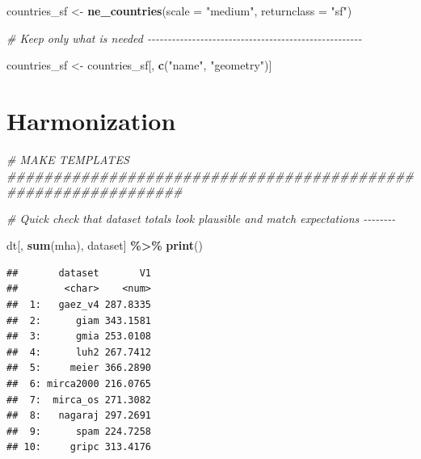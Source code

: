 \documentclass[
  11pt,
]{article}
\newenvironment{Shaded}{\begin{snugshade}}{\end{snugshade}}
\newcommand{\AttributeTok}[1]{\textcolor[rgb]{0.13,0.29,0.53}{#1}}
\newcommand{\CommentTok}[1]{\textcolor[rgb]{0.56,0.35,0.01}{\textit{#1}}}
\newcommand{\FunctionTok}[1]{\textcolor[rgb]{0.13,0.29,0.53}{\textbf{#1}}}
\newcommand{\NormalTok}[1]{#1}
\newcommand{\OtherTok}[1]{\textcolor[rgb]{0.56,0.35,0.01}{#1}}
\newcommand{\SpecialCharTok}[1]{\textcolor[rgb]{0.81,0.36,0.00}{\textbf{#1}}}
\newcommand{\StringTok}[1]{\textcolor[rgb]{0.31,0.60,0.02}{#1}}
\begin{document}
\begin{Shaded}
\begin{Highlighting}[]
\NormalTok{countries\_sf }\OtherTok{\textless{}{-}} \FunctionTok{ne\_countries}\NormalTok{(}\AttributeTok{scale =} \StringTok{"medium"}\NormalTok{, }\AttributeTok{returnclass =} \StringTok{"sf"}\NormalTok{)}

\CommentTok{\# Keep only what is needed {-}{-}{-}{-}{-}{-}{-}{-}{-}{-}{-}{-}{-}{-}{-}{-}{-}{-}{-}{-}{-}{-}{-}{-}{-}{-}{-}{-}{-}{-}{-}{-}{-}{-}{-}{-}{-}{-}{-}{-}{-}{-}{-}{-}{-}{-}{-}{-}{-}{-}{-}{-}{-}}

\NormalTok{countries\_sf }\OtherTok{\textless{}{-}}\NormalTok{ countries\_sf[, }\FunctionTok{c}\NormalTok{(}\StringTok{"name"}\NormalTok{, }\StringTok{"geometry"}\NormalTok{)]}
\end{Highlighting}
\end{Shaded}

\newpage

\section{Harmonization}\label{harmonization}

\begin{Shaded}
\begin{Highlighting}[]
\CommentTok{\# MAKE TEMPLATES \#\#\#\#\#\#\#\#\#\#\#\#\#\#\#\#\#\#\#\#\#\#\#\#\#\#\#\#\#\#\#\#\#\#\#\#\#\#\#\#\#\#\#\#\#\#\#\#\#\#\#\#\#\#\#\#\#\#\#\#\#\#\#}

\CommentTok{\# Quick check that dataset totals look plausible and match expectations {-}{-}{-}{-}{-}{-}{-}{-}}

\NormalTok{dt[, }\FunctionTok{sum}\NormalTok{(mha), dataset] }\SpecialCharTok{\%\textgreater{}\%}
  \FunctionTok{print}\NormalTok{()}
\end{Highlighting}
\end{Shaded}

\begin{verbatim}
##       dataset       V1
##        <char>    <num>
##  1:   gaez_v4 287.8335
##  2:      giam 343.1581
##  3:      gmia 253.0108
##  4:      luh2 267.7412
##  5:     meier 366.2890
##  6: mirca2000 216.0765
##  7:  mirca_os 271.3082
##  8:   nagaraj 297.2691
##  9:      spam 224.7258
## 10:     gripc 313.4176
\end{verbatim}
\end{document}

